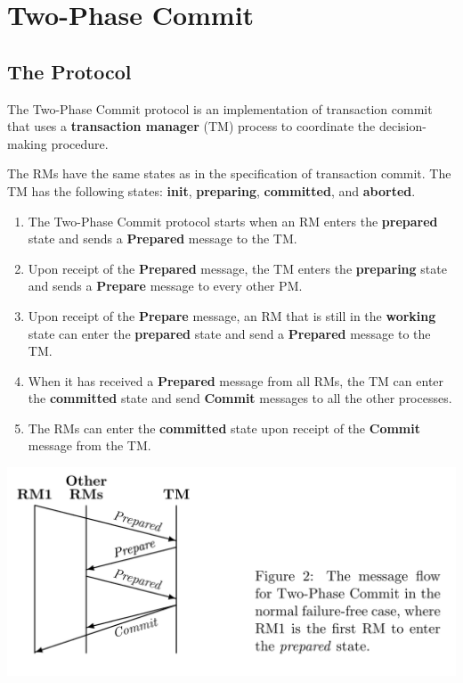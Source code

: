 \documentclass[11pt]{article}
\begin{document}
\section{Two-Phase Commit}
\label{sec:orgf5a2697}
\subsection{The Protocol}
\label{sec:org3434304}
The Two-Phase Commit protocol is an implementation of transaction commit that uses a \textbf{transaction
manager} (TM) process to coordinate the decision-making procedure.

The RMs have the same states as in the specification of transaction commit. The TM has the following
states: \textbf{init}, \textbf{preparing}, \textbf{committed}, and \textbf{aborted}.

\begin{enumerate}
\item The Two-Phase Commit protocol starts when an RM enters the \textbf{prepared} state and sends a \textbf{Prepared}
message to the TM.
\item Upon receipt of the \textbf{Prepared} message, the TM enters the \textbf{preparing} state and sends a \textbf{Prepare} message
to every other PM.
\item Upon receipt of the \textbf{Prepare} message, an RM that is still in the \textbf{working} state can enter the
\textbf{prepared} state and send a \textbf{Prepared} message to the TM.
\item When it has received a \textbf{Prepared} message from all RMs, the TM can enter the \textbf{committed} state and send
\textbf{Commit} messages to all the other processes.
\item The RMs can enter the \textbf{committed} state upon receipt of the \textbf{Commit} message from the TM.
\end{enumerate}
\begin{center}
\includegraphics[width=.8\textwidth]{../../images/papers/2.png}
\label{}
\end{center}
\end{document}
